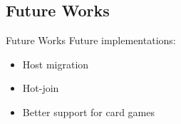 \subsection{Future Works}
\begin{frame}{Future Works}
  Future implementations:
  \begin{itemize}
   \item<1-> Host migration
   \item<2-> Hot-join
   \item<3-> Better support for card games
  \end{itemize}

\end{frame}
